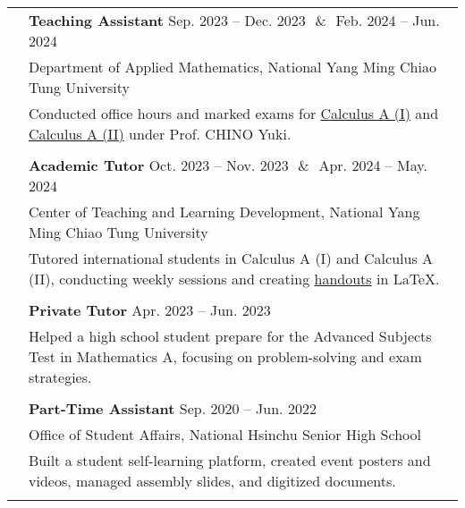 \documentclass[letterpaper, 11pt]{article}
\begin{document}
\begin{center}
\begin{longtable}{p{0.76in}p{5.93in}}

        & \textbf{Teaching Assistant}  \hfill Sep. 2023 -- Dec. 2023\ \,\&\ \,Feb. 2024 -- Jun. 2024 \\
        & Department of Applied Mathematics, National Yang Ming Chiao Tung University\\
        & Conducted office hours and marked exams for \href{https://reurl.cc/Djp5jN}{Calculus A (I)} and \href{https://reurl.cc/RqoMez}{Calculus A (II)} under Prof. CHINO Yuki.\\
        & \\

        & \textbf{Academic Tutor} \hfill Oct. 2023 -- Nov. 2023\ \,\&\ \,Apr. 2024 -- May. 2024\\
        & Center of Teaching and Learning Development, National Yang Ming Chiao Tung University\\
        & Tutored international students in Calculus A (I) and Calculus A (II), conducting weekly sessions and creating \href{https://github.com/eiken59/2024_II_Tutor}{handouts} in \LaTeX.\\
        & \\

        & \textbf{Private Tutor} \hfill Apr. 2023 -- Jun. 2023 \\
        & Helped a high school student prepare for the Advanced Subjects Test in Mathematics A, focusing on problem-solving and exam strategies.\\
        & \\

        & \textbf{Part-Time Assistant} \hfill Sep. 2020 -- Jun. 2022 \\
        & Office of Student Affairs, National Hsinchu Senior High School\\
        & Built a student self-learning platform, created event posters and videos, managed assembly slides, and digitized documents.\\
        & \\


\end{longtable}
\end{center}
\end{document}
